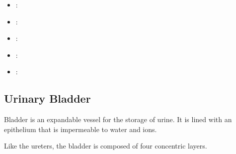 \begin{multicols}{2}
\begin{itemize}
  \begin{center}
  \end{center}
  
  \item {}:
  
  \begin{center}
  \end{center}
  
  \item {}:
  
  \begin{center}
  \end{center}
  
  \item {}:
  
  \begin{center}
  \end{center}
  
  \item {}:
  
  \begin{center}
  \end{center}
  
  \item {}:
  
  \begin{center}
  \end{center}
  
\end{itemize}
\end{multicols}

\newpage

\subsection{Urinary Bladder}
Bladder is an expandable vessel for the storage of urine. It is lined with an epithelium that is impermeable to water and ions.

Like the ureters, the bladder is composed of four concentric layers.

\begin{center}
\end{center}

